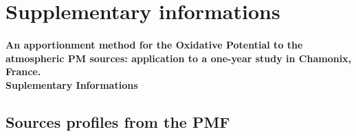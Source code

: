 \section{Supplementary informations}

%

\renewcommand{\thesubsection}{S\arabic{subsection}}

\paragraph{An apportionment method for the Oxidative Potential to the atmospheric PM
sources: application to a one-year study in Chamonix, France.\\
Suplementary Informations}

%

%
%

\subsection{Sources profiles from the PMF}
\label{si-1-sources-profiles-from-the-pmf}

